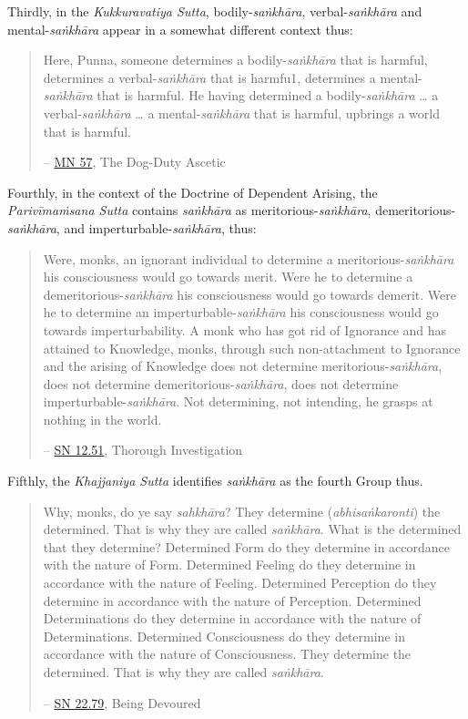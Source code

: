 Thirdly, in the \emph{Kukkuravatiya Sutta}, bodily-\emph{saṅkhāra}, verbal-\emph{saṅkhāra} and mental-\emph{saṅkhāra} appear in a somewhat different context thus:

\begin{quote}
Here, Punna, someone determines a bodily-\emph{saṅkhāra} that is harmful, determines a verbal-\emph{saṅkhāra} that is harmfu1, determines a mental-\emph{saṅkhāra} that is harmful. He having determined a bodily-\emph{saṅkhāra} \ldots{} a verbal-\emph{saṅkhāra} \ldots{} a mental-\emph{saṅkhāra} that is harmful, upbrings a world that is harmful.

 -- \href{https://suttacentral.net/mn57/en/bodhi}{MN 57}, The Dog-Duty Ascetic
\end{quote}

Fourthly, in the context of the Doctrine of Dependent Arising, the \emph{Parivīmaṁsana Sutta} contains \emph{saṅkhāra} as meritorious-\emph{saṅkhāra}, demeritorious-\emph{saṅkhāra}, and imperturbable-\emph{saṅkhāra}, thus:

\begin{quote}
Were, monks, an ignorant individual to determine a meritorious-\emph{saṅkhāra} his consciousness would go towards merit. Were he to determine a demeritorious-\emph{saṅkhāra} his consciousness would go towards demerit. Were he to determine an imperturbable-\emph{saṅkhāra} his consciousness would go towards imperturbability. A monk who has got rid of Ignorance and has attained to Knowledge, monks, through such non-attachment to Ignorance and the arising of Knowledge does not determine meritorious-\emph{saṅkhāra}, does not determine demeritorious-\emph{saṅkhāra}, does not determine imperturbable-\emph{saṅkhāra}. Not determining, not intending, he grasps at nothing in the world.

 -- \href{https://suttacentral.net/sn12.51/en/sujato}{SN 12.51}, Thorough Investigation
\end{quote}

Fifthly, the \emph{Khajjaniya Sutta} identifies \emph{saṅkhāra} as the fourth Group thus.

\begin{quote}
Why, monks, do ye say \emph{sahkhāra}? They determine (\emph{abhisaṅkaronti}) the determined. That is why they are called \emph{saṅkhāra}. What is the determined that they determine? Determined Form do they determine in accordance with the nature of Form. Determined Feeling do they determine in accordance with the nature of Feeling. Determined Perception do they determine in accordance with the nature of Perception. Determined Determinations do they determine in accordance with the nature of Determinations. Determined Consciousness do they determine in accordance with the nature of Consciousness. They determine the determined. That is why they are called \emph{saṅkhāra}.

 -- \href{https://suttacentral.net/sn22.79/en/bodhi}{SN 22.79}, Being Devoured
\end{quote}

